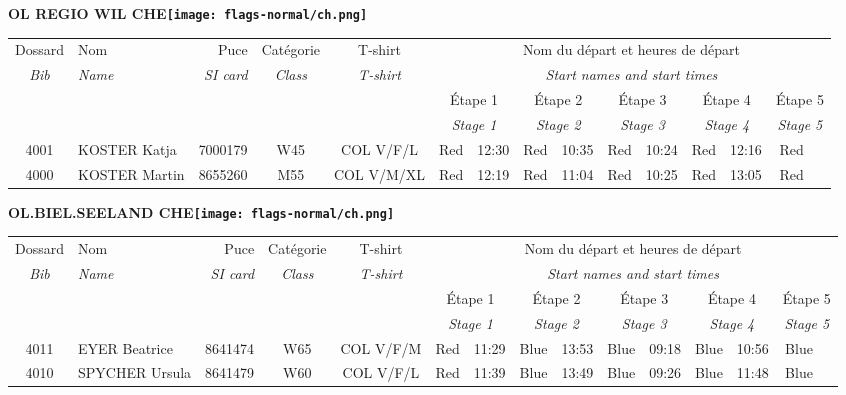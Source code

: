 \documentclass{report}
\begin{document}
\newpage
  \Huge \centering \bfseries OL REGIO WIL  CHE\normalfont \footnotesize \sffamily \hfill \texttt{[image: flags-normal/ch.png]} \newline 
  \begin{longtable}{|c|l|r|c|c|*{5}{cc|}}
    Dossard & Nom  & Puce    & Catégorie & T-shirt & \multicolumn{10}{c|}{Nom du départ et heures de départ} \\
    \itshape Bib     & \itshape Name & \itshape SI card & \itshape Class  & \itshape  T-shirt  & \multicolumn{10}{c|}{\itshape Start names and start times} \\
    \hline
    & & & & & \multicolumn{2}{c|}{Étape 1} & \multicolumn{2}{c|}{Étape 2} & \multicolumn{2}{c|}{Étape 3} & \multicolumn{2}{c|}{Étape 4} & \multicolumn{2}{c|}{Étape 5} \\
    & & & & & \multicolumn{2}{c|}{\itshape Stage 1} & \multicolumn{2}{c|}{\itshape Stage 2} & \multicolumn{2}{c|}{\itshape Stage 3} & \multicolumn{2}{c|}{\itshape Stage 4} & \multicolumn{2}{c|}{\itshape Stage 5} \\
    \hline
    4001 & KOSTER Katja & 7000179 & W45 & COL V/F/L & Red & 12:30 & Red & 10:35 & Red & 10:24 & Red & 12:16 & Red &  \\
    4000 & KOSTER Martin & 8655260 & M55 & COL V/M/XL & Red & 12:19 & Red & 11:04 & Red & 10:25 & Red & 13:05 & Red &  \\
  \end{longtable}
\newpage
  \Huge \centering \bfseries OL.BIEL.SEELAND  CHE\normalfont \footnotesize \sffamily \hfill \texttt{[image: flags-normal/ch.png]} \newline 
  \begin{longtable}{|c|l|r|c|c|*{5}{cc|}}
    Dossard & Nom  & Puce    & Catégorie & T-shirt & \multicolumn{10}{c|}{Nom du départ et heures de départ} \\
    \itshape Bib     & \itshape Name & \itshape SI card & \itshape Class  & \itshape  T-shirt  & \multicolumn{10}{c|}{\itshape Start names and start times} \\
    \hline
    & & & & & \multicolumn{2}{c|}{Étape 1} & \multicolumn{2}{c|}{Étape 2} & \multicolumn{2}{c|}{Étape 3} & \multicolumn{2}{c|}{Étape 4} & \multicolumn{2}{c|}{Étape 5} \\
    & & & & & \multicolumn{2}{c|}{\itshape Stage 1} & \multicolumn{2}{c|}{\itshape Stage 2} & \multicolumn{2}{c|}{\itshape Stage 3} & \multicolumn{2}{c|}{\itshape Stage 4} & \multicolumn{2}{c|}{\itshape Stage 5} \\
    \hline
    4011 & EYER Beatrice & 8641474 & W65 & COL V/F/M & Red & 11:29 & Blue & 13:53 & Blue & 09:18 & Blue & 10:56 & Blue &  \\
    4010 & SPYCHER Ursula & 8641479 & W60 & COL V/F/L & Red & 11:39 & Blue & 13:49 & Blue & 09:26 & Blue & 11:48 & Blue &  \\
  \end{longtable}
\end{document}
